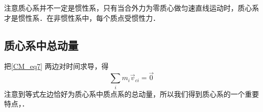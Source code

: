 注意质心系并不一定是惯性系，只有当合外力为零质心做匀速直线运动时，质心系才是惯性系．在非惯性系中，每个质点受惯性力．

\subsection{质心系中总动量}
把\autoref{CM_eq7} 两边对时间求导，得
\begin{equation}\label{CM_eq8}
\sum_i m_i \vec v_{ci} = \vec 0
\end{equation}
注意到等式左边恰好为质心系中质点系的总动量，所以我们得到质心系的一个重要特点，．
